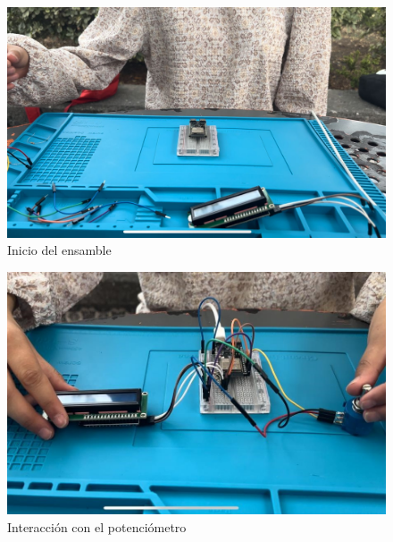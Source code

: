     
    \begin{figure}[H]
        \centering
        \includegraphics[scale=0.15]{35/Img/evidenciaM21.jpeg}
        \caption{Inicio del ensamble}
    \end{figure}
    
    \begin{figure}[H]
        \centering
        \includegraphics[scale=0.34]{35/Img/evidenciaM22.jpeg}
        \caption{Interacción con el potenciómetro}
    \end{figure}
    
